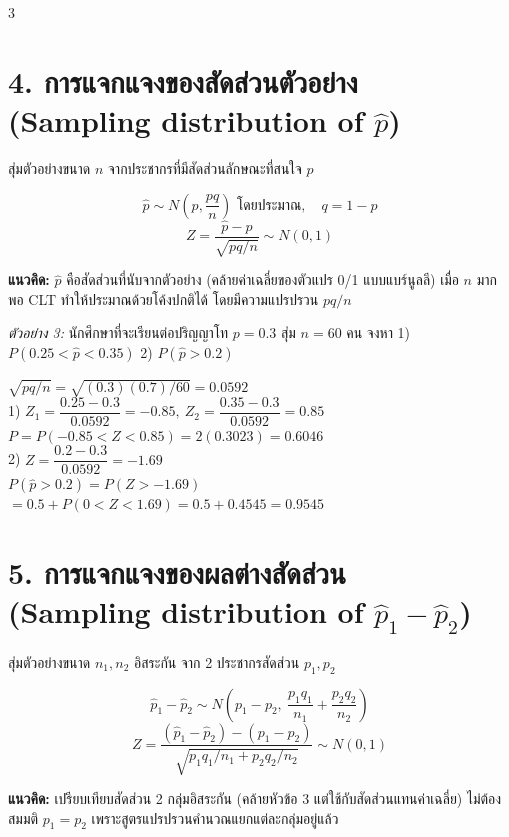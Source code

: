 \documentclass[9pt]{extarticle}
\begin{document}
\begin{multicols}{3}
\section*{4. การแจกแจงของสัดส่วนตัวอย่าง\\(Sampling distribution of $\hat p$)}
สุ่มตัวอย่างขนาด $n$ จากประชากร\allowbreak ที่มีสัดส่วน\allowbreak ลักษณะที่สนใจ $p$
\begin{formulabox}
$$\hat p \sim N\left(p,\dfrac{pq}{n}\right) \text{ โดยประมาณ},\quad q=1-p$$
$$Z=\dfrac{\hat p-p}{\sqrt{pq/n}}\sim N(0,1)$$
\end{formulabox}
\begin{ideabox}
\textbf{แนวคิด:} $\hat p$ คือสัดส่วนที่นับจาก\allowbreak ตัวอย่าง (คล้ายค่าเฉลี่ยของ\allowbreak ตัวแปร 0/1 แบบแบร์นูลลี) เมื่อ $n$ มากพอ CLT ทำให้\allowbreak ประมาณด้วยโค้งปกติได้ โดยมี\allowbreak ความแปรปรวน $pq/n$
\end{ideabox}

\textit{ตัวอย่าง 3:} นักศึกษาที่จะเรียนต่อปริญญาโท $p{=}0.3$ สุ่ม $n{=}60$ คน จงหา 1) $P(0.25{<}\hat p{<}0.35)$ 2) $P(\hat p{>}0.2)$
\begin{solbox}
$\sqrt{pq/n}=\sqrt{(0.3)(0.7)/60}=0.0592$\\[3pt]
1) $Z_1=\dfrac{0.25-0.3}{0.0592}=-0.85,\ Z_2=\dfrac{0.35-0.3}{0.0592}=0.85$\\
$P=P(-0.85{<}Z{<}0.85)=2(0.3023)=0.6046$\\[3pt]
2) $Z=\dfrac{0.2-0.3}{0.0592}=-1.69$\\
$P(\hat p{>}0.2)=P(Z{>}-1.69)$\\
$=0.5+P(0{<}Z{<}1.69)=0.5+0.4545=0.9545$
\end{solbox}

\section*{5. การแจกแจงของผลต่างสัดส่วน\\(Sampling distribution of $\hat p_1-\hat p_2$)}
สุ่มตัวอย่างขนาด $n_1,n_2$ อิสระกัน จาก 2 ประชากรสัดส่วน $p_1,p_2$
\begin{formulabox}
$$\hat p_1-\hat p_2 \sim N\!\left(p_1-p_2,\ \dfrac{p_1q_1}{n_1}+\dfrac{p_2q_2}{n_2}\right)$$
$$Z=\dfrac{(\hat p_1-\hat p_2)-(p_1-p_2)}{\sqrt{p_1q_1/n_1+p_2q_2/n_2}}\sim N(0,1)$$
\end{formulabox}
\begin{ideabox}
\textbf{แนวคิด:} เปรียบเทียบสัดส่วน 2 กลุ่มอิสระกัน (คล้ายหัวข้อ 3 แต่ใช้กับสัดส่วนแทนค่าเฉลี่ย) ไม่ต้องสมมติ $p_1{=}p_2$ เพราะสูตรแปรปรวนคำนวณแยกแต่ละกลุ่มอยู่แล้ว
\end{ideabox}


\end{multicols}
\end{document}
